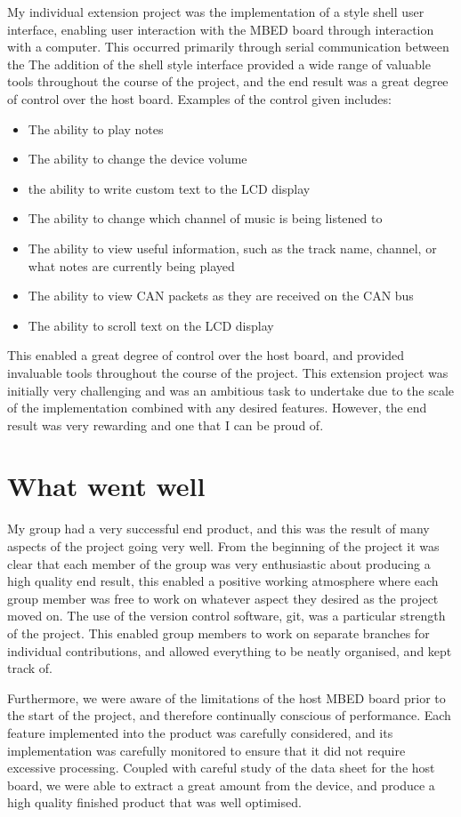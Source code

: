 My individual extension project was the implementation of a style shell user 
interface, enabling user interaction with the MBED board through interaction 
with a computer. This occurred primarily through serial communication between the 
The addition of the shell style interface 
provided a wide range of valuable tools throughout the course of the project, 
and the end result was a great degree of control over the 
host board. Examples of the control given includes: 
\begin{itemize}
    \item The ability to play notes
    \item The ability to change the device volume
    \item the ability to write custom text to the LCD display 
    \item The ability to change which channel of music is being listened to
    \item The ability to view useful information, such as the track name, channel,
or what notes are currently being played
    \item The ability to view CAN packets as they are received on the CAN bus 
    \item The ability to scroll text on the LCD display 
\end{itemize}
This enabled a great degree of control over the host board, and provided 
invaluable tools throughout the course of the project. This extension project 
was initially very challenging and was an ambitious task to undertake due to the 
scale of the implementation combined with any desired features. However, the end 
result was very rewarding and one that I can be proud of. 

\section{What went well}

My group had a very successful end product, and this was the result of many 
aspects of the project going very well. From the beginning of the project it was 
clear that each member of the group was very enthusiastic about producing a high 
quality end result, this enabled a positive working atmosphere where each group 
member was free to work on whatever aspect they desired as the project moved on.
The use of the version control software, git, was a particular strength of the 
project. This enabled group members to work on separate branches for individual 
contributions, and allowed everything to be neatly organised, and kept track of. 
\par\bigskip\noindent
Furthermore, we were aware of the limitations of the host MBED board prior to the 
start of the project, and therefore continually conscious of performance. Each 
feature implemented into the product was carefully considered, and its 
implementation was carefully monitored to ensure that it did not require excessive 
processing. Coupled with careful study of the data sheet for the host board, we 
were able to extract a great amount from the device, and produce a high quality 
finished product that was well optimised. 

